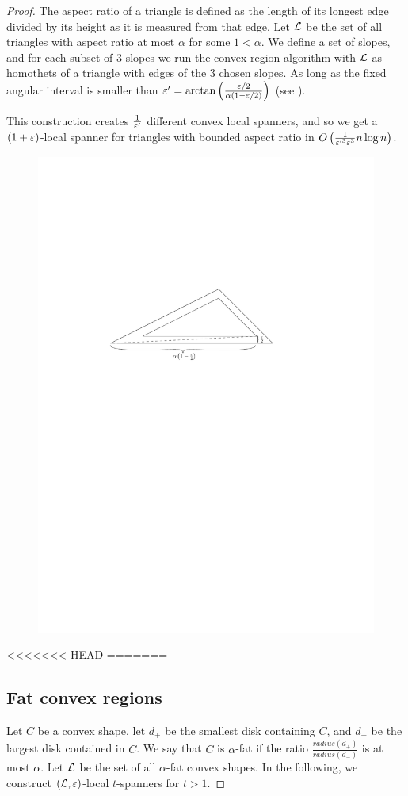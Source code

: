 \documentclass[12pt]{article}%
\begin{document}
\begin{proof}
The aspect ratio of a triangle is defined as the length of its longest
edge divided by its height as it is measured from that edge. Let $\mathcal{L}$
be the set of all triangles with aspect ratio at most $\alpha$ for
some $1 < \alpha$. We define a set of slopes, and for each subset of 3
slopes we run the convex region algorithm with $\mathcal{L}$ as homothets of a
triangle with edges of the 3 chosen slopes. As long as the fixed
angular interval is smaller than
$\varepsilon' = \arctan\left(\frac{\varepsilon/2}{\alpha(1-\varepsilon/2)}\right)$ (see
).

This construction creates $\frac{1}{\varepsilon'}$ different convex local
spanners, and so we get a $(1+\varepsilon)$-local spanner for triangles with
bounded aspect ratio in
$O\left(\frac{1}{\varepsilon'^3\varepsilon^3} n\log n\right)$.


\begin{figure}
    \centering
    \includegraphics[width=0.6\linewidth]{figs/triangle_shadow}
\end{figure}


<<<<<<< HEAD
=======
\subsection{Fat convex regions}

Let $C$ be a convex shape, let $d_+$ be the smallest disk containing $C$, and $d_-$ be the largest disk contained in $C$. We say that $C$ is $\alpha$-fat if the ratio $\frac{radius(d_+)}{radius(d_-)}$ is at most $\alpha$. Let $\mathcal{L}$ be the set of all $\alpha$-fat convex shapes. In the following, we construct $(\mathcal{L}, \varepsilon)$-local $t$-spanners for $t>1$. 


\end{proof}
\end{document}
